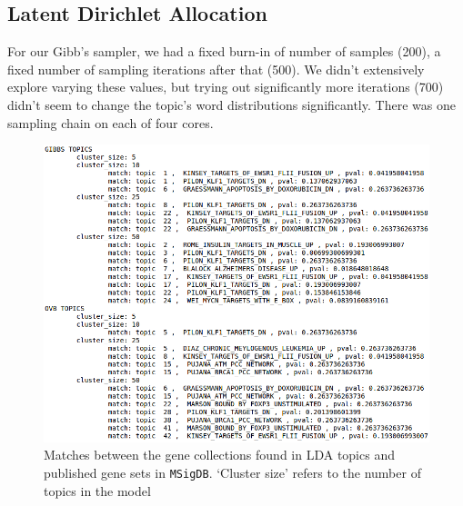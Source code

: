 \documentclass{article}
\begin{document}
\subsection{Latent Dirichlet Allocation}
\label{ldaappendix}
For our Gibb's sampler, we had a fixed burn-in of number of samples (200), a fixed number of sampling iterations after that (500). We didn't extensively explore varying these values, but trying out significantly more iterations (700) didn't seem to change the topic's word distributions significantly. There was one sampling chain on each of four cores.

\begin{figure}
    \centering
    \includegraphics[width=1\textwidth]{figs/pathways}
    \caption{Matches between the gene collections found in LDA topics and published gene sets in \texttt{MSigDB}. `Cluster size' refers to the number of topics in the model}
    \label{fig:pathways}
\end{figure}
\end{document}

